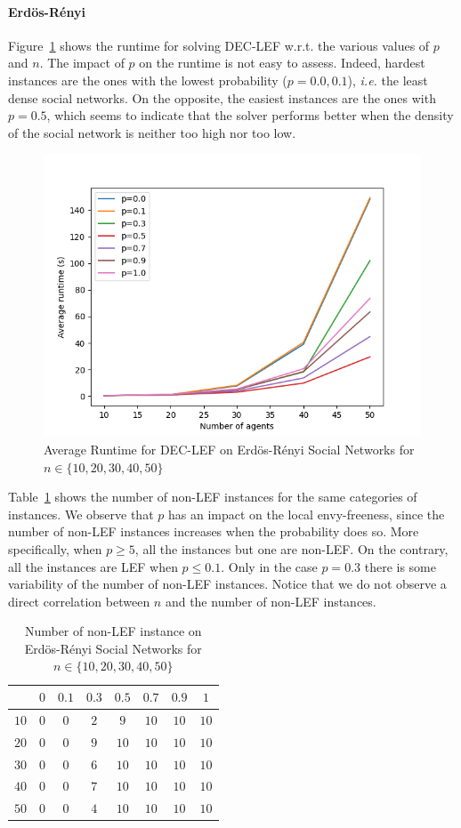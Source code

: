 \documentclass{article}
\begin{document}
\paragraph{Erd\"os-R\'enyi} Figure~\ref{fig:runtime-erdos-renyi} shows the runtime for solving DEC-LEF w.r.t. the various values of  $p$ and $n$. The impact of $p$ on the runtime is not easy to assess. Indeed, hardest instances are the ones with the lowest probability ($p = 0.0, 0.1$), {\em i.e.} the least dense social networks. On the opposite, the easiest instances are the ones with $p=0.5$, which seems to indicate that the solver performs better when the density of the social network is neither too high nor too low. 

\begin{figure}[htb]
\centering
\includegraphics[width=0.45\linewidth]{results-runtime-ER.png}
\caption{Average Runtime for DEC-LEF on Erd\"os-R\'enyi Social Networks for $n \in \{10,20,30,40,50\}$\label{fig:runtime-erdos-renyi}}
\end{figure}

Table~\ref{tab:non-lef-erdos-renyi} shows the number of non-LEF instances for the same categories of instances. We observe that $p$ has an impact on the local envy-freeness, since the number of non-LEF instances increases when the probability does so. More specifically, when $p \geq 5$, all the instances but one are non-LEF. On the contrary, all the instances are LEF when $p \leq 0.1$. Only in the case $p=0.3$ there is some variability of the number of non-LEF instances. Notice that we do not observe a direct correlation between $n$ and the number of non-LEF instances.

\begin{table}[htb]
\centering
\begin{tabular}{|c|c|c|c|c|c|c|c|}
	\hline
	\backslashbox{$n$}{$p$} & $0$ & $0.1$ & $0.3$ & $0.5$ & $0.7$ & $0.9$ & $1$ \\ \hline
	$10$ & $0$ & $0$ & $2$ & $9$ & $10$ & $10$ & $10$ \\
	$20$ & $0$ & $0$ & $9$ & $10$ & $10$ & $10$ & $10$ \\
	$30$ & $0$ & $0$ & $6$ & $10$ & $10$ & $10$ & $10$ \\
	$40$ & $0$ & $0$ & $7$ & $10$ & $10$ & $10$ & $10$ \\
	$50$ & $0$ & $0$ & $4$ & $10$ & $10$ & $10$ & $10$ \\
	\hline
\end{tabular}
\caption{Number of non-LEF instance on Erd\"os-R\'enyi Social Networks for $n \in \{10,20,30,40,50\}$\label{tab:non-lef-erdos-renyi}}
\end{table}
\end{document}
